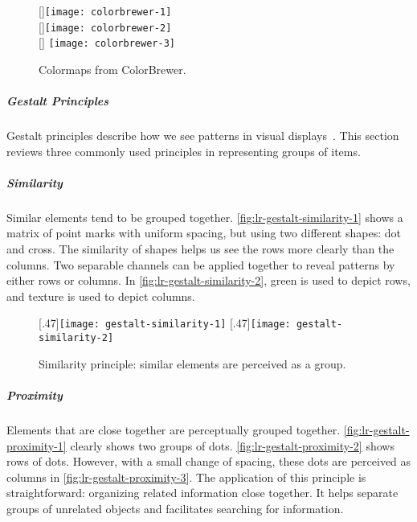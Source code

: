 \begin{figure}[!htb]
\centering
{}[\columnwidth]{\texttt{[image: colorbrewer-1]}} 
\\
[\columnwidth]{\hspace{-.15\columnwidth}\texttt{[image: colorbrewer-2]}}
\\
[\columnwidth]{\hspace{-.05\columnwidth} \texttt{[image: colorbrewer-3]}}
\caption{Colormaps from ColorBrewer. }
\end{figure}

\subparagraph{Gestalt Principles}
\label{sub:lr-gestalt}
Gestalt principles describe how we see patterns in visual displays~\cite{Koffka1935}. This section reviews three commonly used principles in representing groups of items.

\subparagraph{Similarity} 
Similar elements tend to be grouped together. \autoref{fig:lr-gestalt-similarity-1} shows a matrix of point marks with uniform spacing, but using two different shapes: dot and cross. The similarity of shapes helps us see the rows more clearly than the columns. Two separable channels can be applied together to reveal patterns by either rows or columns. In \autoref{fig:lr-gestalt-similarity-2}, green is used to depict rows, and texture is used to depict columns.

\begin{figure}[!htb]
\centering
{}[.47\columnwidth]{\texttt{[image: gestalt-similarity-1]}} 
\hfill
{}[.47\columnwidth]{\texttt{[image: gestalt-similarity-2]}} \label{fig:lr-gestalt-similarity}
\caption{Similarity principle: similar elements are perceived as a group. }
\end{figure}

\subparagraph{Proximity} 
Elements that are close together are perceptually grouped together. \autoref{fig:lr-gestalt-proximity-1} clearly shows two groups of dots. \autoref{fig:lr-gestalt-proximity-2} shows rows of dots. However, with a small change of spacing, these dots are perceived as columns in \autoref{fig:lr-gestalt-proximity-3}. The application of this principle is straightforward: organizing related information close together. It helps separate groups of unrelated objects and facilitates searching for information.


